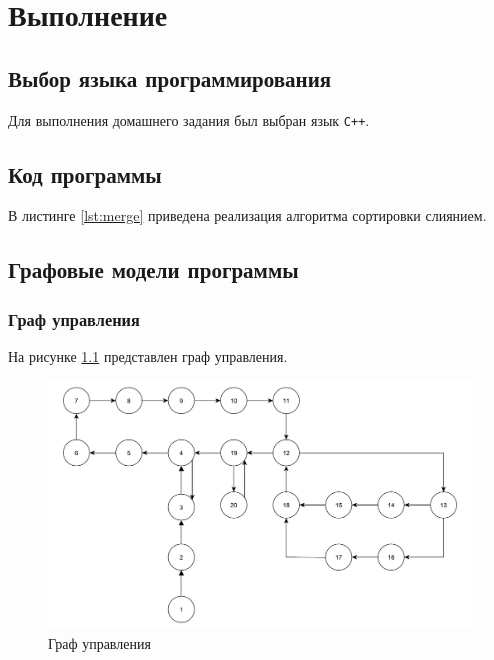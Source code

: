 \chapter{Выполнение}

\section{Выбор языка программирования}
Для выполнения домашнего задания был выбран язык \texttt{C++}.

\section{Код программы}

В листинге \ref{lst:merge} приведена реализация алгоритма сортировки слиянием.



\section{Графовые модели программы}

\subsection{Граф управления}

На рисунке \ref{fg:mg} представлен граф управления.

\begin{figure}[h]
	\centering
	\includegraphics[height=0.4\textheight]{img/граф_управления.pdf}
	\caption{Граф управления}
	\label{fg:mg}
\end{figure}


